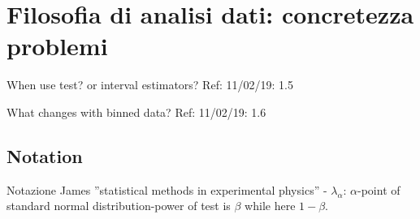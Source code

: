 \section{Filosofia di analisi dati: concretezza problemi}

\begin{frame}{When use test? or interval estimators?}\frameintoc
Ref: 11/02/19: 1.5
\end{frame}

\begin{frame}{What changes with binned data?}
Ref: 11/02/19: 1.6
\end{frame}

\subsection{Notation}

\begin{frame}{}
Notazione James ''statistical methods in experimental physics'' - $\lambda_{\alpha}$: $\alpha$-point of standard normal distribution-power of test is $\beta$ while here $1-\beta$.
\end{frame}